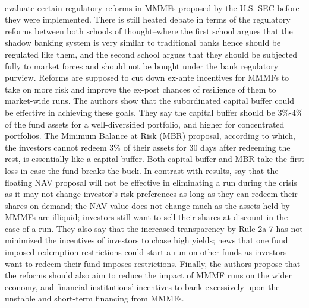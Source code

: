 \documentclass[11pt]{article}
\begin{document}
\paragraph{} \cite{hanson2015evaluation} evaluate certain regulatory reforms in MMMFs proposed by the U.S. SEC before they were implemented. There is still heated debate in terms of the regulatory reforms between both schools of thought--where the first school argues that the shadow banking system is very similar to traditional banks hence should be regulated like them, and the second school argues that they should be subjected fully to market forces and should not be bought under the bank regulatory purview. Reforms are supposed to cut down ex-ante incentives for MMMFs to take on more risk and improve the ex-post chances of resilience of them to market-wide runs. The authors show that the subordinated capital buffer could be effective in achieving these goals. They say the capital buffer should be 3\%-4\% of the fund assets for a well-diversified portfolio, and higher for concentrated portfolios. The Minimum Balance at Risk (MBR) proposal, according to which, the investors cannot redeem 3\% of their assets for 30 days after redeeming the rest, is essentially like a capital buffer. Both capital buffer and MBR take the first loss in case the fund breaks the buck. In contrast with \cite{schmidt2016runs} results, \cite{hanson2015evaluation} say that the floating NAV proposal will not be effective in eliminating a run during the crisis as it may not change investor's risk preferences as long as they can redeem their shares on demand; the NAV value does not change much as the assets held by MMMFs are illiquid; investors still want to sell their shares at discount in the case of a run. They also say that the increased transparency by Rule 2a-7 has not minimized the incentives of investors to chase high yields; news that one fund imposed redemption restrictions could start a run on other funds as investors want to redeem their fund imposes restrictions. Finally, the authors propose that the reforms should also aim to reduce the impact of MMMF runs on the wider economy, and financial institutions' incentives to bank excessively upon the unstable and short-term financing from MMMFs.  
\end{document}
